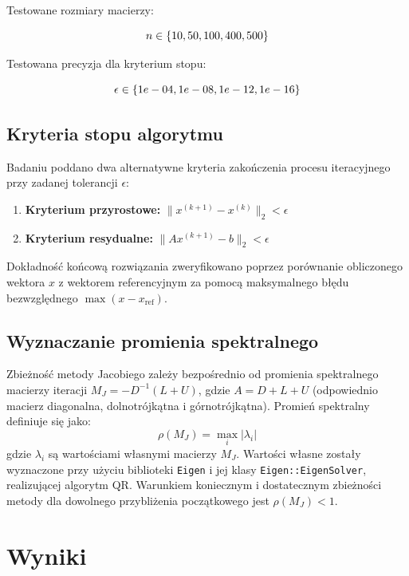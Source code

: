 \documentclass[twoside]{article}
\begin{document}
Testowane rozmiary macierzy: 

\begin{equation}
\large
n \in \{10,50,100,400,500\}
\end{equation} 

Testowana precyzja dla kryterium stopu: 

\begin{equation}
    \large
    \epsilon \in \{1e-04, 1e-08, 1e-12, 1e-16\}
\end{equation}


\subsection{Kryteria stopu algorytmu}
Badaniu poddano dwa alternatywne kryteria zakończenia procesu iteracyjnego przy zadanej tolerancji $\epsilon$:
\begin{enumerate}
    \item \textbf{Kryterium przyrostowe:} $\|x^{(k+1)} - x^{(k)}\|_2 < \epsilon$
    \item \textbf{Kryterium resydualne:} $\|A x^{(k+1)} - b\|_2 < \epsilon$
\end{enumerate}
Dokładność końcową rozwiązania zweryfikowano poprzez porównanie obliczonego wektora $x$ z wektorem referencyjnym za pomocą maksymalnego błędu bezwzględnego 
$\max(x - x_{\text{ref}})$.

\subsection{Wyznaczanie promienia spektralnego}
Zbieżność metody Jacobiego zależy bezpośrednio od promienia spektralnego macierzy iteracji $M_J = -D^{-1}(L+U)$, gdzie $A = D + L + U$ (odpowiednio macierz
diagonalna, dolnotrójkątna i górnotrójkątna). Promień spektralny definiuje się jako:
\begin{equation}
\rho(M_J) = \max_{i} |\lambda_i|
\end{equation}
gdzie $\lambda_i$ są wartościami własnymi macierzy $M_J$. Wartości własne zostały wyznaczone przy użyciu biblioteki \texttt{Eigen} i jej klasy
\texttt{Eigen::EigenSolver}, realizującej algorytm QR. Warunkiem koniecznym i dostatecznym zbieżności metody dla dowolnego przybliżenia początkowego
jest $\rho(M_J) < 1$.

\newpage

\section{Wyniki}
\end{document}
